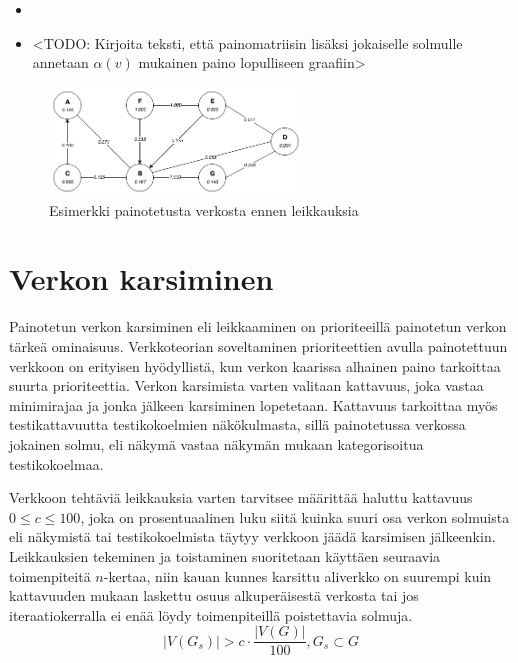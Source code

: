   \begin{itemize}
    \item <TODO: Kirjoita teksti esimerkille painotetusta verkosta, jota käytetään priorisoinnin syötteenä>
    \item <TODO: Kirjoita teksti, että painomatriisin lisäksi jokaiselle solmulle annetaan \(\alpha(v)\) mukainen paino lopulliseen graafiin>
  \end{itemize}

  \begin{figure}[H]
    \centering
    \includegraphics[width=0.6\textwidth]{assets/painotettu-verkko-ennen.png}
    \caption{Esimerkki painotetusta verkosta ennen leikkauksia}
    \label{fig:painotettu-verkko-ennen}
  \end{figure}

\section{Verkon karsiminen} \label{ch:10_verkon_karsiminen}

  Painotetun verkon karsiminen eli leikkaaminen on prioriteeillä painotetun verkon tärkeä ominaisuus.
  Verkkoteorian soveltaminen prioriteettien avulla painotettuun verkkoon on erityisen hyödyllistä, kun verkon kaarissa alhainen paino tarkoittaa suurta prioriteettia.
  Verkon karsimista varten valitaan kattavuus, joka vastaa minimirajaa ja jonka jälkeen karsiminen lopetetaan.
  Kattavuus tarkoittaa myös testikattavuutta testikokoelmien näkökulmasta, sillä painotetussa verkossa jokainen solmu, eli näkymä vastaa näkymän mukaan kategorisoitua testikokoelmaa.

  Verkkoon tehtäviä leikkauksia varten tarvitsee määrittää haluttu kattavuus \(0 \leq c \leq 100\), joka on prosentuaalinen luku siitä kuinka suuri osa verkon solmuista eli näkymistä tai testikokoelmista täytyy verkkoon jäädä karsimisen jälkeenkin. Leikkauksien tekeminen ja toistaminen suoritetaan käyttäen seuraavia toimenpiteitä \(n\)-kertaa, niin kauan kunnes karsittu aliverkko on suurempi kuin kattavuuden mukaan laskettu osuus alkuperäisestä verkosta tai jos iteraatiokerralla ei enää löydy toimenpiteillä poistettavia solmuja.
  \[|V(G_s)| > c \cdot \frac{|V(G)|}{100}, G_s \subset G\]

